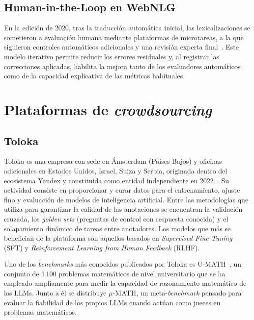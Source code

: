 \subsection{Human-in-the-Loop en WebNLG}

En la edición de 2020, tras la traducción automática inicial, las
lexicalizaciones se sometieron a evaluación humana mediante plataformas de
microtareas, a la que siguieron controles automáticos adicionales y una
revisión experta final~\cite{CastroFerreira2020}. Este modelo iterativo permite
reducir los errores residuales y, al registrar las correcciones aplicadas,
habilita la mejora tanto de los evaluadores automáticos como de la capacidad
explicativa de las métricas habituales.

\section{Plataformas de \textit{crowdsourcing}}

\subsection{Toloka}

Toloka es una empresa con sede en Ámsterdam (Países Bajos) y oficinas
adicionales en Estados Unidos, Israel, Suiza y Serbia, originada dentro del
ecosistema Yandex y constituida como entidad independiente en
2022~\cite{TolokaAbout}. Su actividad consiste en proporcionar y curar datos
para el entrenamiento, ajuste fino y evaluación de modelos de inteligencia
artificial. Entre las metodologías que utiliza para garantizar la calidad de
las anotaciones se encuentran la validación cruzada, los \textit{golden sets}
(preguntas de control con respuesta conocida) y el solapamiento dinámico de
tareas entre anotadores. Los modelos que más se benefician de la plataforma son
aquellos basados en \textit{Supervised Fine-Tuning} (SFT) y
\textit{Reinforcement Learning from Human Feedback} (RLHF).

Uno de los \textit{benchmarks} más conocidos publicados por Toloka es
U-MATH~\cite{Chernyshev2024_UMATH}, un conjunto de 1\,100 problemas matemáticos
de nivel universitario que se ha empleado ampliamente para medir la capacidad
de razonamiento matemático de los LLMs. Junto a él se distribuye $\mu$-MATH, un
meta-\textit{benchmark} pensado para evaluar la fiabilidad de los propios LLMs
cuando actúan como jueces en problemas matemáticos.

